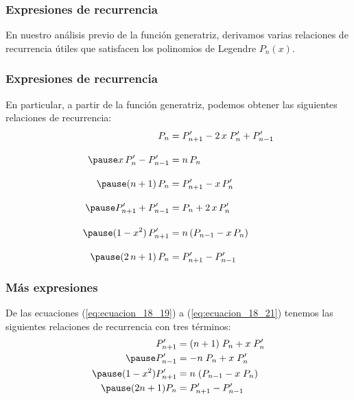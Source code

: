 \documentclass[12pt]{beamer}
\begin{document}
\begin{frame}
\frametitle{Expresiones de recurrencia}
En nuestro análisis previo de la función generatriz, derivamos varias relaciones de recurrencia útiles que satisfacen los polinomios de Legendre $P_{n} (x)$.
\end{frame}
\begin{frame}
\frametitle{Expresiones de recurrencia}
En particular, a partir de la función generatriz, podemos obtener las siguientes relaciones de recurrencia:
\pause
\begin{eqnarray*}
\begin{aligned}
P_{n} &= P_{n+1}^{\prime} - 2 \, x \; P_{n}^{\prime} + P_{n-1}^{\prime} \\[1em] \pause
x \, P_{n}^{\prime} - P_{n-1}^{\prime} &=  n \, P_{n} \\[1em] \pause
(n + 1) \, P_{n} &= P_{n+1}^{\prime} - x \, P_{n}^{\prime} \\[1em] \pause
P_{n+1}^{\prime} + P_{n-1}^{\prime} &=  P_{n} + 2 \, x \, P_{n}^{\prime} \\[1em] \pause
(1 - x^{2}) \, P_{n+1}^{\prime} &= n \, (P_{n-1} - x \, P_{n}) \\[1em] \pause
(2 \, n + 1) \, P_{n} &= P_{n+1}^{\prime} - P_{n-1}^{\prime}
\end{aligned}
\end{eqnarray*}
\end{frame}
\begin{frame}
\frametitle{Más expresiones}
 De las ecuaciones (\ref{eq:ecuacion_18_19}) a (\ref{eq:ecuacion_18_21}) tenemos las siguientes relaciones de recurrencia con tres términos:
 \pause
\begin{eqnarray*}
\begin{aligned}
\pderivada{P}_{n+1} &= (n+1) \; P_{n} + x \; \pderivada{P}_{n} \\ \pause
\pderivada{P}_{n-1} &= -n \; P_{n} + x \; \pderivada{P}_{n} \\ \pause
(1 - x^{2}) \pderivada{P}_{n+1} &= n \; (P_{n-1} - x \; P_{n}) \\ \pause
(2n+1) P_{n} &= \pderivada{P}_{n+1} - \pderivada{P}_{n-1}
\end{aligned}
\end{eqnarray*}
\end{frame}
\end{document}

